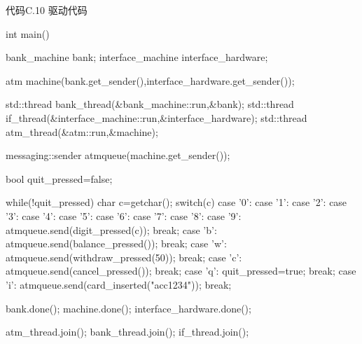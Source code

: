 代码C.10 驱动代码

\begin{cpp}
int main()
{
  bank_machine bank;
  interface_machine interface_hardware;

  atm machine(bank.get_sender(),interface_hardware.get_sender());

  std::thread bank_thread(&bank_machine::run,&bank);
  std::thread if_thread(&interface_machine::run,&interface_hardware);
  std::thread atm_thread(&atm::run,&machine);

  messaging::sender atmqueue(machine.get_sender());

  bool quit_pressed=false;

  while(!quit_pressed)
  {
    char c=getchar();
    switch(c)
    {
    case '0':
    case '1':
    case '2':
    case '3':
    case '4':
    case '5':
    case '6':
    case '7':
    case '8':
    case '9':
      atmqueue.send(digit_pressed(c));
      break;
    case 'b':
      atmqueue.send(balance_pressed());
      break;
    case 'w':
      atmqueue.send(withdraw_pressed(50));
      break;
    case 'c':
      atmqueue.send(cancel_pressed());
      break;
    case 'q':
      quit_pressed=true;
      break;
    case 'i':
      atmqueue.send(card_inserted("acc1234"));
      break;
    }
  }

  bank.done();
  machine.done();
  interface_hardware.done();

  atm_thread.join();
  bank_thread.join();
  if_thread.join();
}
\end{cpp}